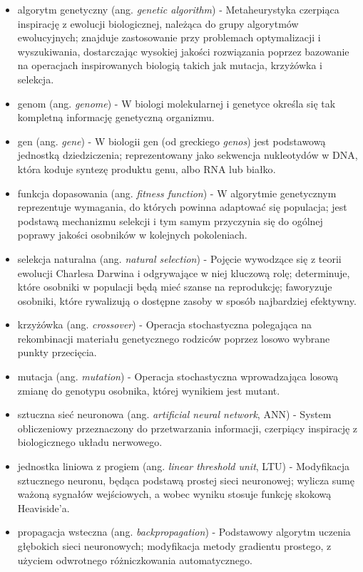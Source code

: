 \documentclass[a4paper,12pt]{article}
\numberwithin{figure}{section}
\begin{document}
    \begin{itemize}
        \item algorytm genetyczny (ang. \textit{genetic algorithm}) - Metaheurystyka czerpiąca inspirację z ewolucji biologicznej, należąca do grupy algorytmów ewolucyjnych; znajduje zastosowanie przy problemach optymalizacji i wyszukiwania, dostarczając wysokiej jakości rozwiązania poprzez bazowanie na operacjach inspirowanych biologią takich jak mutacja, krzyżówka i selekcja\cite{GeneticAlgorithmsMitchell1996}.
        \item genom (ang. \textit{genome}) - W biologi molekularnej i genetyce określa się tak kompletną informację genetyczną organizmu\cite{WhatIsGenomicMedicine2019}.
        \item gen (ang. \textit{gene}) - W biologii gen (od greckiego \textit{genos}) jest podstawową jednostką dziedziczenia; reprezentowany jako sekwencja nukleotydów w DNA, która koduje syntezę produktu genu, albo RNA lub białko\cite{GeneWiki}.
        \item funkcja dopasowania (ang. \textit{fitness function}) - W algorytmie genetycznym reprezentuje wymagania, do których powinna adaptować się populacja; jest podstawą mechanizmu selekcji i tym samym przyczynia się do ogólnej poprawy jakości osobników w kolejnych pokoleniach\cite{IntroductionToEvolutionaryComputing2015}.
        \item selekcja naturalna (ang. \textit{natural selection}) - Pojęcie wywodzące się z teorii ewolucji Charlesa Darwina i odgrywające w niej kluczową rolę; determinuje, które osobniki w populacji będą mieć szanse na reprodukcję; faworyzuje osobniki, które rywalizują o dostępne zasoby w sposób najbardziej efektywny\cite{IntroductionToEvolutionaryComputing2015}.
        \item krzyżówka (ang. \textit{crossover}) - Operacja stochastyczna polegająca na rekombinacji materiału genetycznego rodziców poprzez losowo wybrane punkty przecięcia\cite{IntroductionToEvolutionaryComputing2015}.
        \item mutacja (ang. \textit{mutation}) - Operacja stochastyczna wprowadzająca losową zmianę do genotypu osobnika, której wynikiem jest mutant\cite{IntroductionToEvolutionaryComputing2015}.
        \item sztuczna sieć neuronowa (ang. \textit{artificial neural network}, ANN) - System obliczeniowy przeznaczony do przetwarzania informacji, czerpiący inspirację z biologicznego układu nerwowego\cite{LeksykonSieciNeuronowych2015}.
        \item jednostka liniowa z progiem (ang. \textit{linear threshold unit}, LTU) - Modyfikacja sztucznego neuronu, będąca podstawą prostej sieci neuronowej; wylicza sumę ważoną sygnałów wejściowych, a wobec wyniku stosuje funkcję skokową Heaviside'a\cite{UczenieMaszynowe2018}.
        \item propagacja wsteczna (ang. \textit{backpropagation}) - Podstawowy algorytm uczenia głębokich sieci neuronowych; modyfikacja metody gradientu prostego, z użyciem odwrotnego różniczkowania automatycznego\cite{UczenieMaszynowe2018}.
    \end{itemize}
\end{document}

